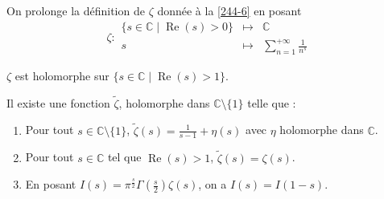 
	\begin{proposition}
		On prolonge la définition de $\zeta$ donnée à la \cref{244-6} en posant
		\[
			\zeta :
			\begin{array}{ccc}
				\{ s \in \mathbb{C} \mid \operatorname{Re}(s) > 0 \} &\mapsto& \mathbb{C} \\
				s &\mapsto& \sum_{n=1}^{+\infty} \frac{1}{n^s}
			\end{array}
		\]
	\end{proposition}

	\begin{proposition}
		$\zeta$ est holomorphe sur $\{ s \in \mathbb{C} \mid \operatorname{Re}(s) > 1 \}$.
	\end{proposition}


	\begin{theorem}
		Il existe une fonction $\widetilde{\zeta}$, holomorphe dans $\mathbb{C} \setminus \{ 1 \}$ telle que :
		\begin{enumerate}[label=(\roman*)]
			\item Pour tout $s \in \mathbb{C} \setminus \{ 1 \}$, $\widetilde{\zeta}(s) = \frac{1}{s-1} + \eta(s)$ avec $\eta$ holomorphe dans $\mathbb{C}$.
			\item Pour tout $s \in \mathbb{C}$ tel que $\operatorname{Re}(s) > 1$, $\widetilde{\zeta}(s) = \zeta(s)$.
			\item En posant $I(s) = \pi^{\frac{s}{2}} \Gamma \left( \frac{s}{2} \right) \zeta(s)$, on a $I(s) = I(1-s)$.
		\end{enumerate}
	\end{theorem}


